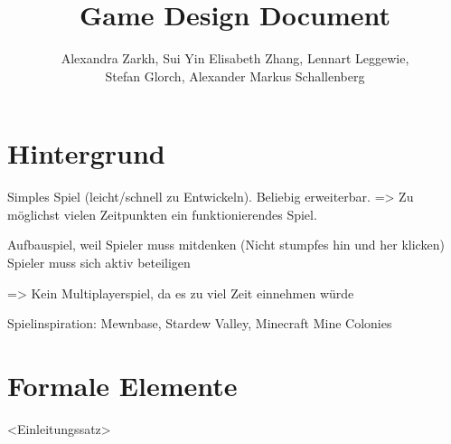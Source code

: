 \documentclass[paper=A4,pagesize=auto,12pt,headinclude=true,footinclude=true,BCOR=0mm,DIV=calc]{scrartcl}
\title{Game Design Document}
\author{Alexandra Zarkh, Sui Yin Elisabeth Zhang, Lennart Leggewie,\\ Stefan Glorch, Alexander Markus Schallenberg}
\newcommand{\sectionspace}{
	\vspace{0.5cm}
}
\begin{document}
	
\begin{titlepage}
	\maketitle
\end{titlepage}


\tableofcontents
\newpage

\section{Hintergrund}\label{sec:Hintergrund}
Simples Spiel (leicht/schnell zu Entwickeln). Beliebig erweiterbar.
=> Zu möglichst vielen Zeitpunkten ein funktionierendes Spiel.

Aufbauspiel, weil Spieler muss mitdenken (Nicht stumpfes hin und her klicken)
Spieler muss sich aktiv beteiligen

=> Kein Multiplayerspiel, da es zu viel Zeit einnehmen würde

Spielinspiration: Mewnbase, Stardew Valley, Minecraft Mine Colonies

\sectionspace
\section{Formale Elemente}\label{sec:Formale_Elemente}
<Einleitungssatz>

\sectionspace
\end{document}
